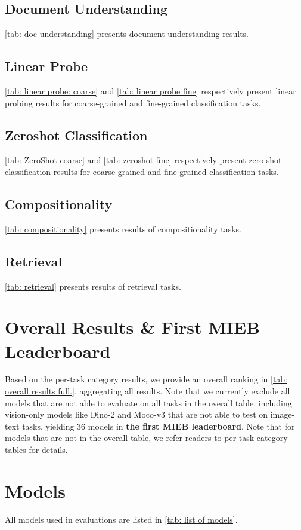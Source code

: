 \subsection{Document Understanding}
\autoref{tab: doc understanding} presents document understanding results.

\subsection{Linear Probe}
\autoref{tab: linear probe: coarse} and \autoref{tab: linear probe fine} respectively present linear probing results for coarse-grained and fine-grained classification tasks.

\subsection{Zeroshot Classification}
\autoref{tab: ZeroShot coarse} and \autoref{tab: zeroshot fine} respectively present zero-shot classification results for coarse-grained and fine-grained classification tasks.

\subsection{Compositionality}
\autoref{tab: compositionality} presents results of compositionality tasks.

\subsection{Retrieval}
\autoref{tab: retrieval} presents results of retrieval tasks.

\section{Overall Results \& First MIEB Leaderboard}
Based on the per-task category results, we provide an overall ranking in \autoref{tab: overall results full.}, aggregating all results. Note that we currently exclude all models that are not able to evaluate on all tasks in the overall table, including vision-only models like Dino-2 and Moco-v3 that are not able to test on image-text tasks, yielding 36 models in \textbf{the first MIEB leaderboard}. Note that for models that are not in the overall table, we refer readers to per task category tables for details.

\section{Models}
All models used in evaluations are listed in \autoref{tab: list of models}. 

